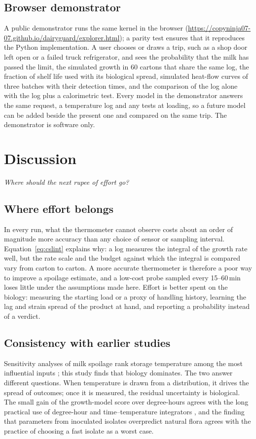 \documentclass[11pt,a4paper,twoside,openany]{book}
\newcommand{\hook}[1]{{\noindent\fontsize{14}{20}\selectfont\itshape\color{dggrey}#1\par}\vspace{14pt}}
\theoremstyle{plain}\newtheorem{proposition}{Proposition}\newtheorem{corollary}{Corollary}
\theoremstyle{definition}\newtheorem{definition}{Definition}[chapter]
\begin{document}
\section{Browser demonstrator}
A public demonstrator runs the same kernel in the browser (\url{https://copyninja07-07.github.io/dairyguard/explorer.html}); a parity test ensures that it reproduces the Python implementation. A user chooses or draws a trip, such as a shop door left open or a failed truck refrigerator, and sees the probability that the milk has passed the limit, the simulated growth in 60 cartons that share the same log, the fraction of shelf life used with its biological spread, simulated heat-flow curves of three batches with their detection times, and the comparison of the log alone with the log plus a calorimetric test. Every model in the demonstrator answers the same request, a temperature log and any tests at loading, so a future model can be added beside the present one and compared on the same trip. The demonstrator is software only.

\chapter{Discussion}\label{ch:disc}
\hook{Where should the next rupee of effort go?}
\section{Where effort belongs}
In every run, what the thermometer cannot observe costs about an order of magnitude more accuracy than any choice of sensor or sampling interval. Equation~\eqref{eq:cslint} explains why: a log measures the integral of the growth rate well, but the rate scale and the budget against which the integral is compared vary from carton to carton. A more accurate thermometer is therefore a poor way to improve a spoilage estimate, and a low-cost probe sampled every 15--60\,min loses little under the assumptions made here. Effort is better spent on the biology: measuring the starting load or a proxy of handling history, learning the lag and strain spread of the product at hand, and reporting a probability instead of a verdict.

\section{Consistency with earlier studies}
Sensitivity analyses of milk spoilage rank storage temperature among the most influential inputs \cite{lau2022,buehler2018,qian2023,giannakourou2020}; this study finds that biology dominates. The two answer different questions. When temperature is drawn from a distribution, it drives the spread of outcomes; once it is measured, the residual uncertainty is biological. The small gain of the growth-model score over degree-hours agrees with the long practical use of degree-hour and time--temperature integrators \cite{taoukis1989,kim2020}, and the finding that parameters from inoculated isolates overpredict natural flora agrees with the practice of choosing a fast isolate as a worst case.
\end{document}
